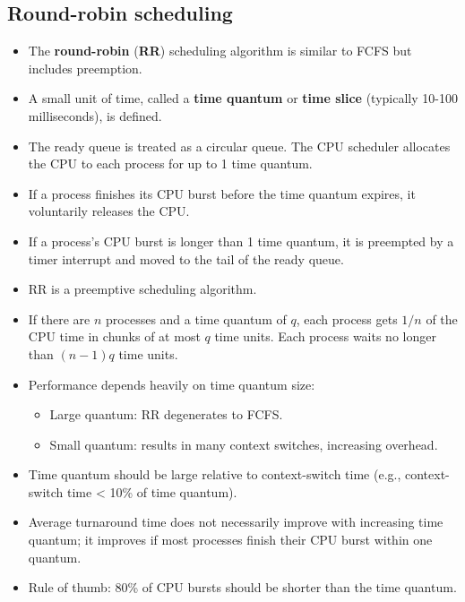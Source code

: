 \subsection{Round-robin scheduling}
\begin{itemize}
    \item The \textbf{round-robin} (\textbf{RR}) scheduling algorithm is similar to FCFS but includes preemption.
    \item A small unit of time, called a \textbf{time quantum} or \textbf{time slice} (typically 10-100 milliseconds), is defined.
    \item The ready queue is treated as a circular queue. The CPU scheduler allocates the CPU to each process for up to 1 time quantum.
    \item If a process finishes its CPU burst before the time quantum expires, it voluntarily releases the CPU.
    \item If a process's CPU burst is longer than 1 time quantum, it is preempted by a timer interrupt and moved to the tail of the ready queue.
    \item RR is a preemptive scheduling algorithm.
    \item If there are $n$ processes and a time quantum of $q$, each process gets $1/n$ of the CPU time in chunks of at most $q$ time units. Each process waits no longer than $(n-1)q$ time units.
    \item Performance depends heavily on time quantum size:
        \begin{itemize}
            \item Large quantum: RR degenerates to FCFS.
            \item Small quantum: results in many context switches, increasing overhead.
        \end{itemize}
    \item Time quantum should be large relative to context-switch time (e.g., context-switch time < 10\% of time quantum).
    \item Average turnaround time does not necessarily improve with increasing time quantum; it improves if most processes finish their CPU burst within one quantum.
    \item Rule of thumb: 80\% of CPU bursts should be shorter than the time quantum.
\end{itemize}


